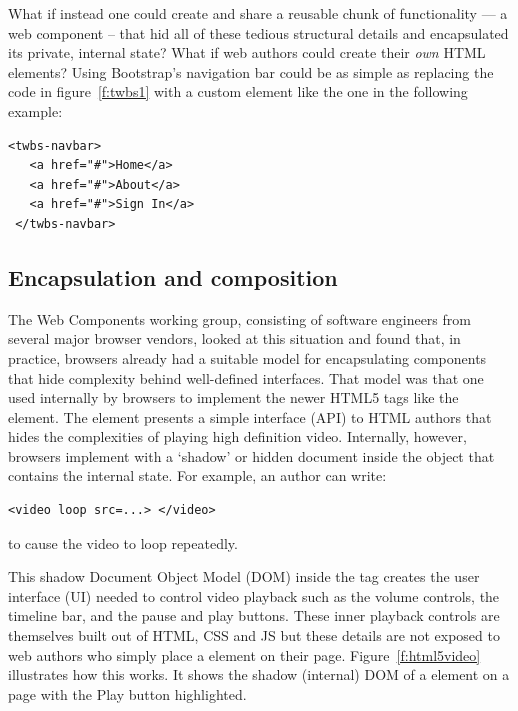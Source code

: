 What if instead one could create and share a reusable chunk of functionality --- a web component -- that hid all of these tedious structural details and encapsulated its private, internal state? 
What if web authors could create their \textit{own} HTML elements?  
Using Bootstrap's navigation bar could be as simple as replacing the code in figure~\ref{f:twbs1} with a custom element like the one in 
the following example:

% 


\begin{lstlisting}[language=HTML5,numbers=none,caption=
{Hypothetical Bootstrap nav bar custom element.},label=l:twbs2,captionpos=below]
 <twbs-navbar>
   <a href="#">Home</a>
   <a href="#">About</a>
   <a href="#">Sign In</a>
 </twbs-navbar>
\end{lstlisting}

\subsection{Encapsulation and composition}

The Web Components working group, consisting of software engineers from several major browser vendors, looked at this situation and found that, in practice, browsers already had a suitable model for encapsulating components that hide complexity behind well-defined interfaces.
That model was that one used internally by browsers to implement the newer HTML5 tags like the \textbf{} element. 
The  element presents a simple interface (API) to HTML authors that hides the complexities of playing high definition video.
Internally, however, browsers implement  with a `shadow' or hidden document inside the object that contains the internal state. 
For example, an author can write:
\begin{lstlisting}[language=HTML5,numbers=none]
	<video loop src=...> </video>
\end{lstlisting}
to cause the video to loop repeatedly.

This shadow Document Object Model (DOM) inside the  tag creates the user interface (UI) needed to control video playback such as the volume controls, the timeline bar, and the pause and play buttons.
These inner playback controls are themselves built out of HTML, CSS and JS but these details are not exposed to web authors who simply place a  element on their page. 
Figure~\ref{f:html5video} illustrates how this works. It shows the shadow (internal) DOM of a  element on a page with the Play button  highlighted.

